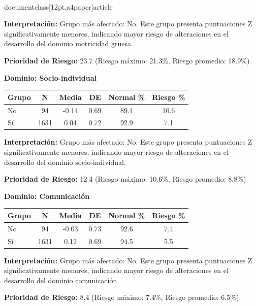 \\documentclass[12pt,a4paper]{article}
\begin{document}
\textbf{Interpretación:} Grupo más afectado: No. Este grupo presenta puntuaciones Z significativamente menores, indicando mayor riesgo de alteraciones en el desarrollo del dominio motricidad gruesa.

\textbf{Prioridad de Riesgo:} 23.7 (Riesgo máximo: 21.3\%, Riesgo promedio: 18.9\%)


\vspace{0.5cm}


\textbf{Dominio: Socio-individual}


\begin{center}
\begin{tabular}{|l|c|c|c|c|c|}
\hline
\textbf{Grupo} & \textbf{N} & \textbf{Media} & \textbf{DE} & \textbf{Normal \%} & \textbf{Riesgo \%} \\
\hline
No & 94 & -0.14 & 0.69 & 89.4 & 10.6 \\
Sí & 1631 & 0.04 & 0.72 & 92.9 & 7.1 \\

\hline
\end{tabular}
\end{center}


\textbf{Interpretación:} Grupo más afectado: No. Este grupo presenta puntuaciones Z significativamente menores, indicando mayor riesgo de alteraciones en el desarrollo del dominio socio-individual.

\textbf{Prioridad de Riesgo:} 12.4 (Riesgo máximo: 10.6\%, Riesgo promedio: 8.8\%)


\vspace{0.5cm}


\textbf{Dominio: Comunicación}


\begin{center}
\begin{tabular}{|l|c|c|c|c|c|}
\hline
\textbf{Grupo} & \textbf{N} & \textbf{Media} & \textbf{DE} & \textbf{Normal \%} & \textbf{Riesgo \%} \\
\hline
No & 94 & -0.03 & 0.73 & 92.6 & 7.4 \\
Sí & 1631 & 0.12 & 0.69 & 94.5 & 5.5 \\

\hline
\end{tabular}
\end{center}


\textbf{Interpretación:} Grupo más afectado: No. Este grupo presenta puntuaciones Z significativamente menores, indicando mayor riesgo de alteraciones en el desarrollo del dominio comunicación.

\textbf{Prioridad de Riesgo:} 8.4 (Riesgo máximo: 7.4\%, Riesgo promedio: 6.5\%)
\end{document}
